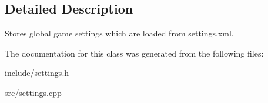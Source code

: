 \subsection{\-Detailed \-Description}
\-Stores global game settings which are loaded from settings.\-xml. 

\-The documentation for this class was generated from the following files\-:\begin{DoxyCompactItemize}
\item 
include/settings.\-h\item 
src/settings.\-cpp\end{DoxyCompactItemize}
